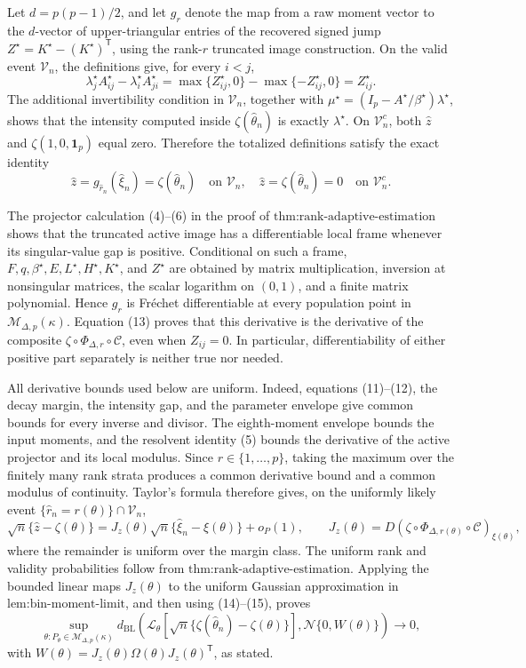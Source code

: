 Let \(d=p(p-1)/2\), and let \(g_r\) denote the map from a raw moment vector to the \(d\)-vector of upper-triangular entries of the recovered signed jump \(Z^\star=K^\star-(K^\star)^{\mathsf T}\), using the rank-\(r\) truncated image construction.  On the valid event \(\mathcal V_n\), the definitions give, for every \(i<j\),
\[
 \lambda_j^\star A_{ij}^\star-\lambda_i^\star A_{ji}^\star
 =\max\{Z_{ij}^\star,0\}-\max\{-Z_{ij}^\star,0\}
 =Z_{ij}^\star.
\tag{13}
\]
The additional invertibility condition in \(\mathcal V_n\), together with
\(\mu^\star=(I_p-A^\star/\beta^\star)\lambda^\star\), shows that the intensity computed inside \(\zeta(\widehat\theta_n)\) is exactly \(\lambda^\star\).  On \(\mathcal V_n^c\), both \(\widehat z\) and \(\zeta(1,0,\mathbf1_p)\) equal zero.  Therefore the totalized definitions satisfy the exact identity
\[
 \widehat z=g_{\widehat r_n}(\widehat\xi_n)=\zeta(\widehat\theta_n)
\quad\text{on }\mathcal V_n,
\quad
 \widehat z=\zeta(\widehat\theta_n)=0
\quad\text{on }\mathcal V_n^c.
\tag{14}
\]

The projector calculation (4)--(6) in the proof of \(\text{thm:rank-adaptive-estimation}\) shows that the truncated active image has a differentiable local frame whenever its singular-value gap is positive.  Conditional on such a frame, \(F,q,\beta^\star,E,L^\star,H^\star,K^\star\), and \(Z^\star\) are obtained by matrix multiplication, inversion at nonsingular matrices, the scalar logarithm on \((0,1)\), and a finite matrix polynomial.  Hence \(g_r\) is Fr\'{e}chet differentiable at every population point in \(\mathcal M_{\Delta,p}(\kappa)\).  Equation (13) proves that this derivative is the derivative of the composite \(\zeta\circ\Phi_{\Delta,r}\circ\mathcal C\), even when \(Z_{ij}=0\).  In particular, differentiability of either positive part separately is neither true nor needed.

All derivative bounds used below are uniform.  Indeed, equations (11)--(12), the decay margin, the intensity gap, and the parameter envelope give common bounds for every inverse and divisor.  The eighth-moment envelope bounds the input moments, and the resolvent identity (5) bounds the derivative of the active projector and its local modulus.  Since \(r\in\{1,\ldots,p\}\), taking the maximum over the finitely many rank strata produces a common derivative bound and a common modulus of continuity.  Taylor's formula therefore gives, on the uniformly likely event \(\{\widehat r_n=r(\theta)\}\cap\mathcal V_n\),
\[
 \sqrt n\{\widehat z-\zeta(\theta)\}
 =J_z(\theta)\sqrt n\{\widehat\xi_n-\xi(\theta)\}+o_P(1),
\qquad
 J_z(\theta)=D(\zeta\circ\Phi_{\Delta,r(\theta)}\circ\mathcal C)_{\xi(\theta)},
\tag{15}
\]
where the remainder is uniform over the margin class.  The uniform rank and validity probabilities follow from \(\text{thm:rank-adaptive-estimation}\).  Applying the bounded linear maps \(J_z(\theta)\) to the uniform Gaussian approximation in \(\text{lem:bin-moment-limit}\), and then using (14)--(15), proves
\[
 \sup_{\theta:P_\theta\in\mathcal M_{\Delta,p}(\kappa)}
 d_{\mathrm{BL}}\!\left(
 \mathcal L_\theta[\sqrt n\{\zeta(\widehat\theta_n)-\zeta(\theta)\}],
 \mathcal N\{0,W(\theta)\}\right)\longrightarrow0,
\]
with \(W(\theta)=J_z(\theta)\Omega(\theta)J_z(\theta)^{\mathsf T}\), as stated.

